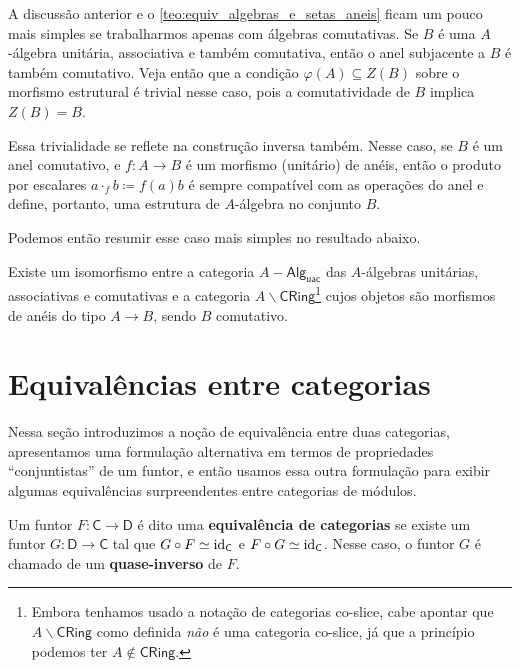 \begin{obs}
  A discussão anterior e o \cref{teo:equiv_algebras_e_setas_aneis} ficam um pouco mais simples se trabalharmos apenas com álgebras comutativas.
  Se $B$ é uma $A$-álgebra unitária, associativa e também comutativa, então o anel subjacente a $B$ é também comutativo.
  Veja então que a condição $\varphi(A) \subseteq Z(B)$ sobre o morfismo estrutural é trivial nesse caso, pois a comutatividade de $B$ implica $Z(B) = B$.

  Essa trivialidade se reflete na construção inversa também.
  Nesse caso, se $B$ é um anel comutativo, e $f: A \to B$ é um morfismo (unitário) de anéis, então o produto por escalares $ a \cdot_{f} b \coloneqq f(a)b$ é sempre compatível com as operações do anel e define, portanto, uma estrutura de $A$-álgebra no conjunto $B$.

  Podemos então resumir esse caso mais simples no resultado abaixo.

  \begin{teo}
    Existe um isomorfismo entre a categoria $A-\mathsf{Alg_{uac}}$ das $A$-álgebras unitárias, associativas e comutativas e a categoria $A \backslash \mathsf{CRing}$\footnote{Embora tenhamos usado a notação de categorias co-slice, cabe apontar que $A \backslash \mathsf{CRing}$ como definida \emph{não} é uma categoria co-slice, já que a princípio podemos ter $A \not\in \mathsf{CRing}$.} cujos objetos são morfismos de anéis do tipo $A \to B$, sendo $B$ comutativo.
  \end{teo}
\end{obs}

\section{Equivalências entre categorias}
\label{sec:equiv_categorias}

Nessa seção introduzimos a noção de equivalência entre duas categorias, apresentamos uma formulação alternativa em termos de propriedades ``conjuntistas'' de um funtor, e então usamos essa outra formulação para exibir algumas equivalências surpreendentes entre categorias de módulos.

\begin{defin}
  Um funtor $F: \mathsf{C} \to \mathsf{D}$ é dito uma \textbf{equivalência de categorias} se existe um funtor $G: \mathsf{D} \to \mathsf{C}$ tal que $G \circ F \simeq \mathrm{id}_{\mathsf{C}}$ e $F \circ G \simeq \mathrm{id}_{\mathsf{C}}$.
  Nesse caso, o funtor $G$ é chamado de um \textbf{quase-inverso} de $F$.
\end{defin}

